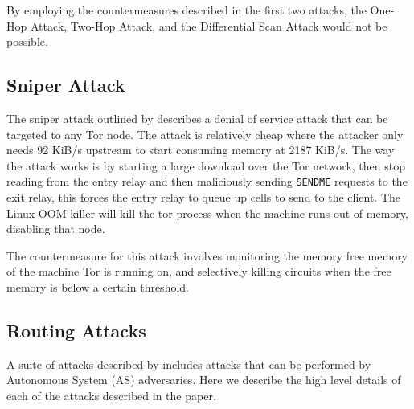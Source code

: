 \documentclass[9pt,technote]{IEEEtran}
\begin{document}
By employing the countermeasures described in the first two attacks, the One-Hop Attack, Two-Hop Attack, and the Differential Scan Attack would not be possible.\\

\subsection{Sniper Attack}
The sniper attack outlined by \citeauthor{jansen2014sniper} describes a denial
of service attack that can be targeted to any Tor node. The attack is relatively
cheap where the attacker only needs 92 KiB/s upstream to start consuming memory
at 2187 KiB/s. The way the attack works is by starting a large download over the
Tor network, then stop reading from the entry relay and then maliciously sending
\texttt{SENDME} requests to the exit relay, this forces the entry relay to queue
up cells to send to the client. The Linux OOM killer will kill the tor process
when the machine runs out of memory, disabling that node.

The countermeasure for this attack involves monitoring the memory free memory of
the machine Tor is running on, and selectively killing circuits when the free
memory is below a certain threshold.

\subsection{Routing Attacks}
A suite of attacks described by \citeauthor{sun2015raptor} includes attacks that
can be performed by Autonomous System (AS) adversaries. Here we describe the
high level details of each of the attacks described in the paper.
\end{document}
